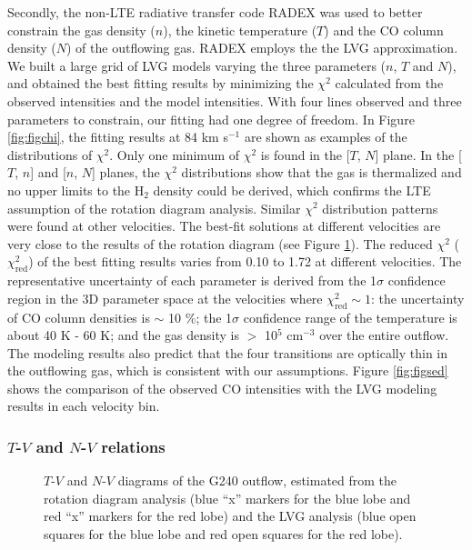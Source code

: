 Secondly, the non-LTE radiative transfer code RADEX \citep{2007A&A...468..627V} was used to better constrain the gas density ($n$), the kinetic temperature ($T$) and the CO column density ($N$) of the outflowing gas. RADEX employs the the LVG approximation. We built a large grid of LVG models varying the three parameters ($n$, $T$ and $N$), and obtained the best fitting results by minimizing the $\chi^2$ calculated from the observed intensities and the model intensities. With four lines observed and three parameters to constrain, our fitting had one degree of freedom. In Figure \ref{fig:figchi}, the fitting results at 84 km s$^{-1}$ are shown as examples of the distributions of $\chi^2$. Only one minimum of $\chi^2$ is found in the [$T$, $N$] plane. In the [$T$, $n$] and [$n$, $N$] planes, the $\chi^2$ distributions show that the gas is thermalized and no upper limits to the H$_2$ density could be derived, which confirms the LTE assumption of the rotation diagram analysis. Similar $\chi^2$ distribution patterns were found at other velocities. The best-fit solutions at different velocities are very close to the results of the rotation diagram (see Figure \ref{fig:figrelation}). The reduced $\chi^2$ ($\chi^2_{\mathrm{red}}$) of the best fitting results varies from 0.10 to 1.72 at different velocities. The representative uncertainty of each parameter is derived from the 1$\sigma$ confidence region in the 3D parameter space at the velocities where $\chi^2_{\mathrm{red}} \sim 1$: the uncertainty of CO column densities is $\sim$ 10 \%; the 1$\sigma$ confidence range of the temperature is about 40 K - 60 K; and the gas density is $>$ 10$^5$ cm$^{-3}$ over the entire outflow. The modeling results also predict that the four transitions are optically thin in the outflowing gas, which is consistent with our assumptions. Figure \ref{fig:figsed} shows the comparison of the observed CO intensities with the LVG modeling results in each velocity bin. 

\subsubsection{$T$-$V$ and $N$-$V$ relations}

\begin{figure}[!tbp]
\caption{$T$-$V$ and $N$-$V$ diagrams of the G240 outflow, estimated from the rotation diagram analysis (blue ``x'' markers for the blue lobe and red ``x'' markers for the red lobe) and the LVG analysis (blue open squares for the blue lobe and red open squares for the red lobe). \label{fig:figrelation}}
\end{figure}

